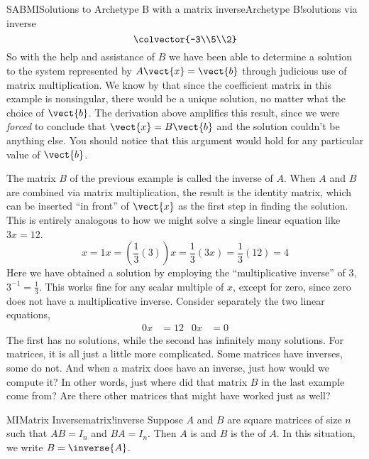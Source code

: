 \begin{example}{SABMI}{Solutions to Archetype B with a matrix inverse}{Archetype B!solutions via inverse}
\begin{equation*}
\colvector{-3\\5\\2}
\end{equation*}
%
So with the help and assistance of $B$ we have been able to determine a solution to the system represented by $A\vect{x}=\vect{b}$ through judicious use of matrix multiplication.  We know by  that since the coefficient matrix in this example is nonsingular, there would be a unique solution, no matter what the choice of $\vect{b}$.  The derivation above amplifies this result, since we were {\em forced} to conclude that $\vect{x}=B\vect{b}$ and the solution couldn't be anything else.  You should notice that this argument would hold for any particular value of $\vect{b}$.
\end{example}
%
The matrix $B$ of the previous example is called the inverse of $A$.  When $A$ and $B$ are combined via matrix multiplication, the result is the identity matrix, which can be inserted ``in front'' of  $\vect{x}$ as the first step in finding the solution.  This is entirely analogous to how we might solve a single linear equation like $3x=12$.
%
\begin{equation*}
x=1x=\left(\frac{1}{3}\left(3\right)\right)x=\frac{1}{3}\left(3x\right)=\frac{1}{3}\left(12\right)=4
\end{equation*}
%
Here we have obtained a solution by employing the ``multiplicative inverse'' of $3$, $3^{-1}=\frac{1}{3}$.  This works fine for any scalar multiple of $x$, except for zero, since zero does not have a multiplicative inverse.  Consider separately the two linear equations,
%
\begin{align*}
0x&=12
&
0x&=0
\end{align*}
%
The first has no solutions, while the second has infinitely many solutions.  For matrices, it is all just a little more complicated.  Some matrices have inverses, some do not.  And when a matrix does have an inverse, just how would we compute it?  In other words, just where did that matrix $B$ in the last example come from?  Are there other matrices that might have worked just as well?
%
%
\begin{definition}{MI}{Matrix Inverse}{matrix!inverse}
Suppose $A$ and $B$ are square matrices of size $n$ such that $AB=I_n$ and $BA=I_n$.  Then $A$ is  and $B$ is the  of $A$.  In this situation, we write $B=\inverse{A}$.
\end{definition}
